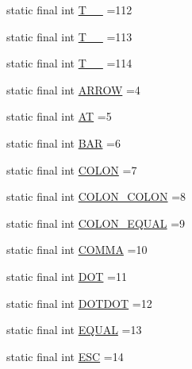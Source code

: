 \begin{DoxyCompactItemize}
\item 
static final int \hyperlink{classorg_1_1tzi_1_1use_1_1parser_1_1use_1_1_u_s_e_lexer_aa1db1cf1653ecc600386b2c435ca6018}{T\-\_\-\-\_} =112
\item 
static final int \hyperlink{classorg_1_1tzi_1_1use_1_1parser_1_1use_1_1_u_s_e_lexer_a111437311315d941ee5513bd138cfdf7}{T\-\_\-\-\_} =113
\item 
static final int \hyperlink{classorg_1_1tzi_1_1use_1_1parser_1_1use_1_1_u_s_e_lexer_a07da65aa65ac3a9ec130603e0faceebb}{T\-\_\-\-\_} =114
\item 
static final int \hyperlink{classorg_1_1tzi_1_1use_1_1parser_1_1use_1_1_u_s_e_lexer_a90e38e7133314f444bc2383365c0f453}{A\-R\-R\-O\-W} =4
\item 
static final int \hyperlink{classorg_1_1tzi_1_1use_1_1parser_1_1use_1_1_u_s_e_lexer_adbdd2d9f5831fdca0edda1d80a39821b}{A\-T} =5
\item 
static final int \hyperlink{classorg_1_1tzi_1_1use_1_1parser_1_1use_1_1_u_s_e_lexer_ac0492c84a8773ecf77bb6a0037a483b9}{B\-A\-R} =6
\item 
static final int \hyperlink{classorg_1_1tzi_1_1use_1_1parser_1_1use_1_1_u_s_e_lexer_a2147bfcceb835581f3913cc6b07c915c}{C\-O\-L\-O\-N} =7
\item 
static final int \hyperlink{classorg_1_1tzi_1_1use_1_1parser_1_1use_1_1_u_s_e_lexer_a10560044ab3f07e2c1acb0ffbd8517b0}{C\-O\-L\-O\-N\-\_\-\-C\-O\-L\-O\-N} =8
\item 
static final int \hyperlink{classorg_1_1tzi_1_1use_1_1parser_1_1use_1_1_u_s_e_lexer_a88b3074253a6774ebfffa9a14e3485a5}{C\-O\-L\-O\-N\-\_\-\-E\-Q\-U\-A\-L} =9
\item 
static final int \hyperlink{classorg_1_1tzi_1_1use_1_1parser_1_1use_1_1_u_s_e_lexer_a48a4351c67d74b9cf64f9dac03e43388}{C\-O\-M\-M\-A} =10
\item 
static final int \hyperlink{classorg_1_1tzi_1_1use_1_1parser_1_1use_1_1_u_s_e_lexer_a842b02d5fc69f21cfa6d81e5a9fdfe1a}{D\-O\-T} =11
\item 
static final int \hyperlink{classorg_1_1tzi_1_1use_1_1parser_1_1use_1_1_u_s_e_lexer_ad08d98eda3384710aa479501caaa2a4d}{D\-O\-T\-D\-O\-T} =12
\item 
static final int \hyperlink{classorg_1_1tzi_1_1use_1_1parser_1_1use_1_1_u_s_e_lexer_ad0037e118b4ca521b0fcd50fd00c2a32}{E\-Q\-U\-A\-L} =13
\item 
static final int \hyperlink{classorg_1_1tzi_1_1use_1_1parser_1_1use_1_1_u_s_e_lexer_adc0605f41de0c43c2a87a29d7d20eda6}{E\-S\-C} =14

\end{DoxyCompactItemize}
